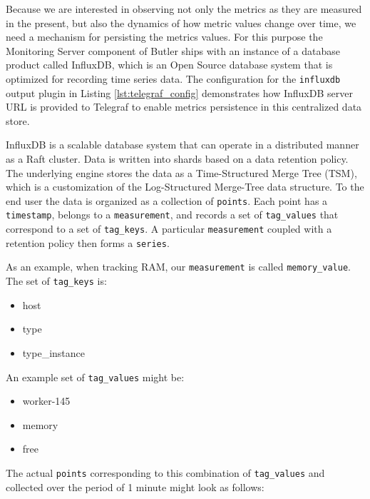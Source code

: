 Because we are interested in observing not only the metrics as they are measured in the present, but also the dynamics of how metric values change over time, we need a mechanism for persisting the metrics values. For this purpose the Monitoring Server component of Butler ships with an instance of a database product called InfluxDB\autocite{InfluxDB}, which is an Open Source database system that is optimized for recording time series data. The configuration for the \texttt{influxdb} output plugin in Listing \ref{lst:telegraf_config} demonstrates how InfluxDB server URL is provided to Telegraf to enable metrics persistence in this centralized data store.

InfluxDB is a scalable database system that can operate in a distributed manner as a Raft\autocite{ongaro2014search} cluster. Data is written into shards based on a data retention policy. The underlying engine stores the data as a Time-Structured Merge Tree (TSM), which is a customization of the Log-Structured Merge-Tree\autocite{o1996log} data structure. To the end user the data is organized as a collection of \texttt{points}. Each point has a \texttt{timestamp}, belongs to a \texttt{measurement}, and records a set of \texttt{tag_values} that correspond to a set of \texttt{tag_keys}. A particular \texttt{measurement} coupled with a retention policy then forms a \texttt{series}.

As an example, when tracking RAM, our \texttt{measurement} is called \texttt{memory_value}. The set of \texttt{tag_keys} is:

\begin{itemize}
\item host
\item type
\item type\_instance
\end{itemize}

An example set of \texttt{tag_values} might be:

\begin{itemize}
\item worker-145
\item memory
\item free
\end{itemize}

The actual \texttt{points} corresponding to this combination of \texttt{tag_values} and collected over the period of 1 minute might look as follows:

